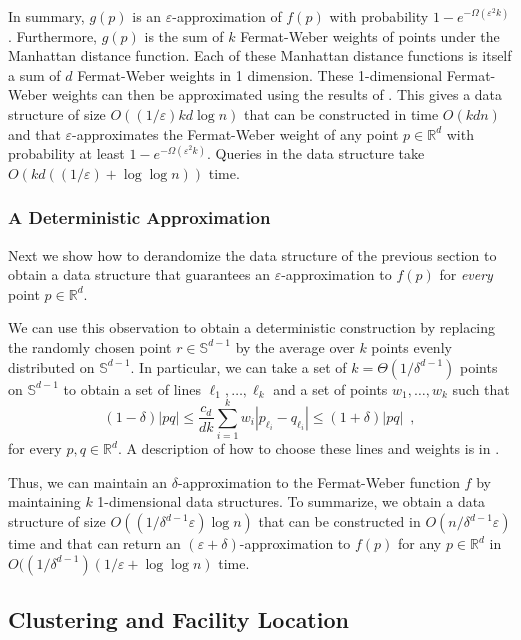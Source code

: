\documentclass[charterfonts,lotsofwhite]{patmorin}
\newcommand{\eps}{\varepsilon}
\begin{document}
In summary, $g(p)$ is an $\eps$-approximation of $f(p)$ with
probability $1-e^{-\Omega(\eps^2k)}$.  Furthermore, $g(p)$ is the sum
of $k$ Fermat-Weber weights of points under the Manhattan distance
function.  Each of these Manhattan distance functions is itself a sum
of $d$ Fermat-Weber weights in 1 dimension.  These 1-dimensional
Fermat-Weber weights can then be approximated using the results of
.  This gives a data structure of size $O((1/\eps)kd\log
n)$ that can be constructed in time $O(kdn)$ and that
$\eps$-approximates the Fermat-Weber weight of any point
$p\in\mathbb{R}^d$ with probability at least $1-e^{-\Omega(\eps^2k)}$.
Queries in the data structure take $O(kd((1/\eps)+\log\log n))$ time.


\subsubsection{A Deterministic Approximation}

Next we show how to derandomize the data structure of the previous
section to obtain a data structure that guarantees an
$\eps$-approximation to $f(p)$ for \emph{every} point
$p\in\mathbb{R}^d$.  


We can use this observation to obtain a deterministic construction by
replacing the randomly chosen point $r\in \mathbb{S}^{d-1}$ by the average over
$k$ points evenly distributed on $\mathbb{S}^{d-1}$.  In particular, we can
take a set of $k=\Theta(1/\delta^{d-1})$ points on $\mathbb{S}^{d-1}$ 
to obtain a set of lines $\ell_1,\ldots,\ell_k$ and a set of points
$w_1,\ldots,w_k$ such that
\[
      (1-\delta)|pq|\le \frac{c_d}{dk} \sum_{i=1}^k w_i|p_{\ell_i}-q_{\ell_i}| 
      \le (1+\delta)|pq| \enspace ,
\]
for every $p,q\in\mathbb{R}^d$.  A description of how to choose these
lines and weights 
is in .

Thus, we can maintain an $\delta$-approximation to the Fermat-Weber
function $f$ by maintaining $k$ 1-dimensional data structures.  To
summarize, we obtain a data structure of size
$O((1/\delta^{d-1}\eps)\log n)$ that can be constructed in
$O(n/\delta^{d-1}\eps)$ time and that can return an
$(\eps+\delta)$-approximation to $f(p)$ for any $p\in\mathbb{R}^d$ in
$O((1/\delta^{d-1})(1/\eps + \log\log n)$ time.

\subsection{Clustering and Facility Location}
\end{document}
